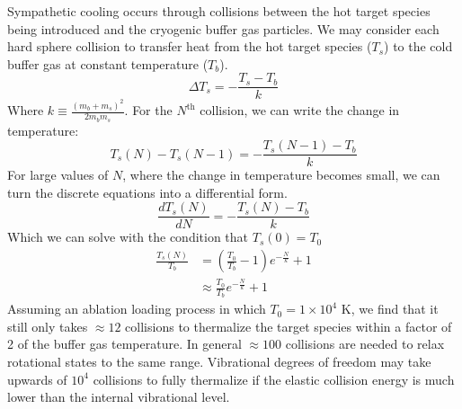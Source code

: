 Sympathetic cooling occurs through collisions between the hot target species being introduced and the cryogenic buffer gas particles. We may consider each hard sphere collision to transfer heat from the hot target species ($T_s$) to the cold buffer gas at constant temperature ($T_b$).
\begin{equation*}
	\Delta T_s = -\frac{T_s - T_b}{k}
\end{equation*}
Where $k \equiv \frac{(m_b + m_s)^2}{2 m_b m_s}$. For the $N^{\text{th}}$ collision, we can write the change in temperature:
\begin{equation*}
	T_s(N) - T_s(N-1) = -\frac{T_s(N-1)-T_b}{k}
\end{equation*}
For large values of $N$, where the change in temperature becomes small, we can turn the discrete equations into a differential form.
\begin{equation*}
	\frac{d T_s(N)}{dN} = -\frac{T_s(N) - T_b}{k}
\end{equation*}
Which we can solve with the condition that $T_s(0)=T_0$
\begin{align*}
	\frac{T_s(N)}{T_b} & = \left(\frac{T_0}{T_b} - 1\right)e^{-\frac{N}{k}} +1 \\
	& \approx \frac{T_0}{T_b}e^{-\frac{N}{k}} + 1
\end{align*}
Assuming an ablation loading process in which $T_0=1 \times 10^4$ K, we find that it still only takes $\approx 12$ collisions to thermalize the target species within a factor of 2 of the buffer gas temperature. In general $\approx 100$ collisions are needed to relax rotational states to the same range. Vibrational degrees of freedom may take upwards of $10^4$ collisions to fully thermalize if the elastic collision energy is much lower than the internal vibrational level.

